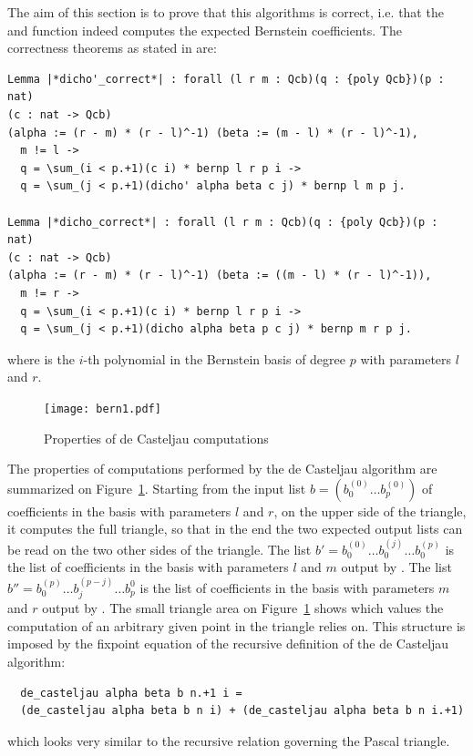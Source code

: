 \documentclass{mscs}
\begin{document}
The aim of this section is to prove that this algorithms is
correct, i.e. that the  and  function
indeed computes the expected Bernstein coefficients. The correctness
theorems as stated in \Coq{} are:
\begin{lstlisting}
Lemma |*dicho'_correct*| : forall (l r m : Qcb)(q : {poly Qcb})(p : nat)
(c : nat -> Qcb)
(alpha := (r - m) * (r - l)^-1) (beta := (m - l) * (r - l)^-1),
  m != l ->
  q = \sum_(i < p.+1)(c i) * bernp l r p i ->
  q = \sum_(j < p.+1)(dicho' alpha beta c j) * bernp l m p j.

Lemma |*dicho_correct*| : forall (l r m : Qcb)(q : {poly Qcb})(p : nat)
(c : nat -> Qcb)
(alpha := (r - m) * (r - l)^-1) (beta := ((m - l) * (r - l)^-1)),
  m != r ->
  q = \sum_(i < p.+1)(c i) * bernp l r p i ->
  q = \sum_(j < p.+1)(dicho alpha beta p c j) * bernp m r p j.
\end{lstlisting}
where  is the $i$-th polynomial in the Bernstein
basis of degree $p$ with parameters $l$ and $r$.
\begin{figure}[ht]
\begin{center}
\texttt{[image: bern1.pdf]}
\end{center}
\caption{\label{bern} Properties of de Casteljau computations}
\end{figure}


The properties of computations performed by the de Casteljau algorithm
are summarized on Figure~\ref{bern}. Starting from the input list
$b = (b_0^{(0)}\dots b_p^{(0)})$ of coefficients in the basis with
parameters $l$ and $r$, on the upper side of the triangle, it
computes the full triangle, so that in the end the two expected output
lists can be read on the two  other sides of the triangle. The list
$b' = b_0^{(0)} \dots b_0^{(j)} \dots b_0^{(p)}$ is the list of
coefficients in the basis with parameters $l$ and $m$ output by
. The list
$b'' = b_0^{(p)} \dots b_j^{(p - j)} \dots b_p^{0}$
 is the list of coefficients in the basis with parameters $m$ and $r$
 output by .  The small triangle area on Figure~\ref{bern} shows which values
the computation of an arbitrary given point in the triangle relies on.
This structure is imposed by the fixpoint
 equation of the recursive definition of the de Casteljau algorithm:
\begin{lstlisting}
  de_casteljau alpha beta b n.+1 i =
  (de_casteljau alpha beta b n i) + (de_casteljau alpha beta b n i.+1)
\end{lstlisting}
which looks very similar to the recursive relation governing the
Pascal triangle.
\end{document}

